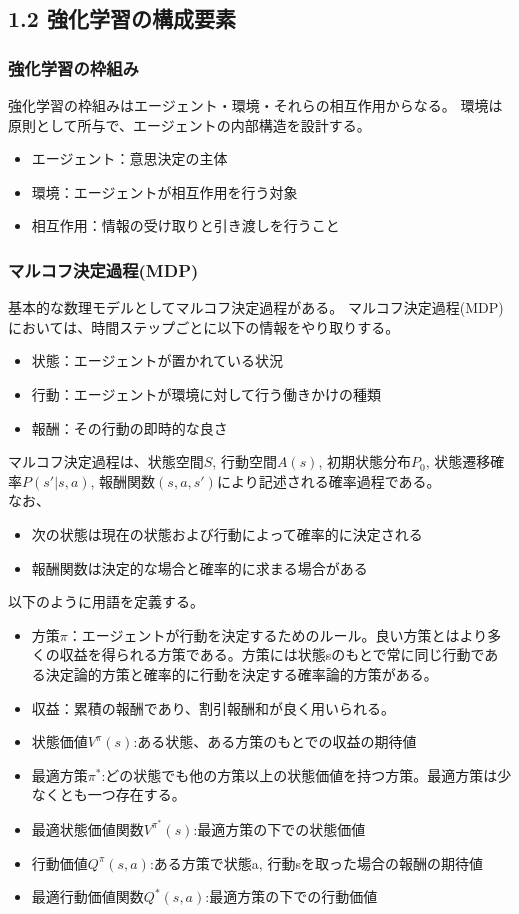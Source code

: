 \documentclass[]{jarticle}
\begin{document}
\subsection*{1.2 強化学習の構成要素}

\subsubsection*{強化学習の枠組み}

強化学習の枠組みはエージェント・環境・それらの相互作用からなる。
環境は原則として所与で、エージェントの内部構造を設計する。
\begin{itemize}
	\item エージェント：意思決定の主体　
	\item 環境：エージェントが相互作用を行う対象
	\item 相互作用：情報の受け取りと引き渡しを行うこと
\end{itemize}

\subsubsection*{マルコフ決定過程(MDP)}
基本的な数理モデルとしてマルコフ決定過程がある。
マルコフ決定過程(MDP)においては、時間ステップごとに以下の情報をやり取りする。
\begin{itemize}
	\item 状態：エージェントが置かれている状況
	\item 行動：エージェントが環境に対して行う働きかけの種類
	\item 報酬：その行動の即時的な良さ
\end{itemize}
マルコフ決定過程は、状態空間$S$, 行動空間$A(s)$, 初期状態分布$P_0$, 状態遷移確率$P(s'|s,a)$, 報酬関数$(s,a,s')$により記述される確率過程である。\\
なお、
\begin{itemize}
	\item 次の状態は現在の状態および行動によって確率的に決定される
	\item 報酬関数は決定的な場合と確率的に求まる場合がある
\end{itemize}
以下のように用語を定義する。
\begin{itemize}
	\item 方策$\pi$：エージェントが行動を決定するためのルール。良い方策とはより多くの収益を得られる方策である。方策には状態sのもとで常に同じ行動である決定論的方策と確率的に行動を決定する確率論的方策がある。
	\item 収益：累積の報酬であり、割引報酬和が良く用いられる。
	\item 状態価値$V^{\pi}(s)$:ある状態、ある方策のもとでの収益の期待値
	\item 最適方策$\pi^*$:どの状態でも他の方策以上の状態価値を持つ方策。最適方策は少なくとも一つ存在する。
    \item 最適状態価値関数$V^{\pi^*}(s)$:最適方策の下での状態価値
    \item 行動価値$Q^\pi(s,a)$:ある方策で状態a, 行動sを取った場合の報酬の期待値
    \item 最適行動価値関数$Q^*(s,a)$:最適方策の下での行動価値
\end{itemize}
\end{document}
